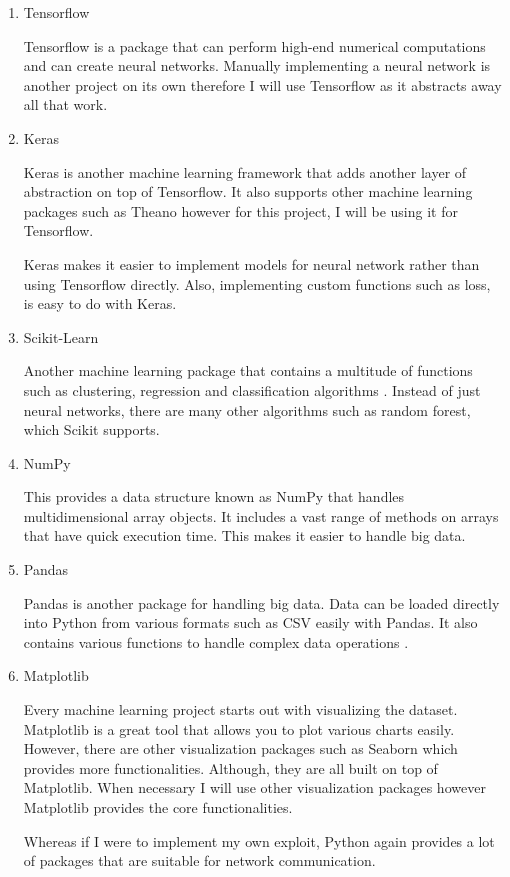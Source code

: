 \documentclass[11pt]{article}
\begin{document}
\begin{enumerate}
  \item{Tensorflow}

  Tensorflow is a package that can perform high-end numerical computations \cite{bg-work-tensorflow} and can create neural networks. Manually implementing a neural network is another project on its own therefore I will use Tensorflow as it abstracts away all that work.

  \item{Keras}

  Keras is another machine learning framework that adds another layer of abstraction on top of Tensorflow. It also supports other machine learning packages such as Theano however for this project, I will be using it for Tensorflow. 

  Keras makes it easier to implement models for neural network rather than using Tensorflow directly. Also, implementing custom functions such as loss, is easy to do with Keras.
  \item{Scikit-Learn}

  Another machine learning package that contains a multitude of functions such as clustering, regression and classification algorithms \cite{bg-work-tensorflow}. Instead of just neural networks, there are many other algorithms such as random forest, which Scikit supports.

  \item{NumPy}

  This provides a data structure known as NumPy that handles multidimensional array objects. It includes a vast range of methods on arrays that have quick execution time. This makes it easier to handle big data.

  \item{Pandas}

  Pandas is another package for handling big data. Data can be loaded directly into Python from various formats such as CSV easily with Pandas. It also contains various functions to handle complex data operations \cite{bg-work-tensorflow}.

  \item{Matplotlib}

  Every machine learning project starts out with visualizing the dataset. Matplotlib is a great tool that allows you to plot various charts easily. However, there are other visualization packages such as Seaborn which provides more functionalities. Although, they are all built on top of Matplotlib. When necessary I will use other visualization packages however Matplotlib provides the core functionalities.

  Whereas if I were to implement my own exploit, Python again provides a lot of packages that are suitable for network communication. 
\end{enumerate}
\end{document}
